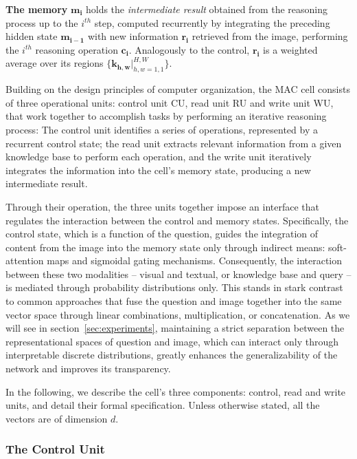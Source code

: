 \documentclass[fleqn]{article}
\newcommand{\secref}[1]{section~\ref{sec:#1}}
\begin{document}
\textbf{The memory} \(\boldsymbol{m_i}\) holds the \textit{intermediate result} obtained from the reasoning process up to the \(i^{th}\) step, computed recurrently by integrating the preceding hidden state \(\boldsymbol{m_{i-1}}\)
with new information \(\boldsymbol{r_{i}}\) retrieved from the image, performing the \(i^{th}\) reasoning operation \(\boldsymbol{c_i}\). Analogously to the control, \(\boldsymbol{r_{i}}\) is  a weighted average over its regions \(\{\boldsymbol{k_{h,w}}|_{h,w=1,1}^{H,W}\}\).

Building on the design principles of computer organization, the MAC cell consists of three operational units: control unit CU, read unit RU and write unit WU, that work together to accomplish tasks by performing an iterative reasoning process: The control unit identifies a series of operations, represented by a recurrent control state; the read unit extracts relevant information from a given knowledge base to perform each operation, and the write unit iteratively integrates the information into the cell's memory state, producing a new intermediate result.

Through their operation, the three units together impose an interface that regulates the interaction between the control and memory states. Specifically, the control state, which is a function of the question, guides the integration of content from the image into the memory state only through indirect means: soft-attention maps and sigmoidal gating mechanisms. Consequently, the interaction between these two modalities -- visual and textual, or knowledge base and query -- is mediated through probability distributions only. This stands in stark contrast to common approaches that fuse the question and image together into the same vector space through linear combinations, multiplication, or concatenation. As we will see in \secref{experiments}, maintaining a strict separation between the representational spaces of question and image, which can interact only through interpretable discrete distributions, greatly enhances the generalizability of the network and improves its transparency.


In the following, we describe the cell's three components: control, read and write units, and detail their formal specification. Unless otherwise stated, all the vectors are of dimension \(d\). 

\subsubsection{The Control Unit}
\label{sec:CU}
\end{document}
